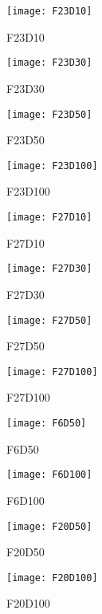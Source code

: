 \begin{figure*}[t]
    \begin{subfigure}[b]{0.24\textwidth}
        \texttt{[image: F23D10]}
        \caption{F23D10}
    \end{subfigure}
    \begin{subfigure}[b]{0.24\textwidth}
        \texttt{[image: F23D30]}
        \caption{F23D30}
    \end{subfigure}    
    \begin{subfigure}[b]{0.24\textwidth}
        \texttt{[image: F23D50]}
        \caption{F23D50}
    \end{subfigure}
    \begin{subfigure}[b]{0.24\textwidth}
        \texttt{[image: F23D100]}
        \caption{F23D100}
    \end{subfigure}

    \begin{subfigure}[b]{0.24\textwidth}
        \texttt{[image: F27D10]}
        \caption{F27D10}
    \end{subfigure}
    \begin{subfigure}[b]{0.24\textwidth}
        \texttt{[image: F27D30]}
        \caption{F27D30}
    \end{subfigure}    
    \begin{subfigure}[b]{0.24\textwidth}
        \texttt{[image: F27D50]}
        \caption{F27D50}
    \end{subfigure}
    \begin{subfigure}[b]{0.24\textwidth}
        \texttt{[image: F27D100]}
        \caption{F27D100}
    \end{subfigure}

    \begin{subfigure}[b]{0.24\textwidth}
        \texttt{[image: F6D50]}
        \caption{F6D50}
    \end{subfigure}
    \begin{subfigure}[b]{0.24\textwidth}
        \texttt{[image: F6D100]}
        \caption{F6D100}
    \end{subfigure}
    \begin{subfigure}[b]{0.24\textwidth}
        \texttt{[image: F20D50]}
        \caption{F20D50}
    \end{subfigure}
    \begin{subfigure}[b]{0.24\textwidth}
        \texttt{[image: F20D100]}
        \caption{F20D100}
    \end{subfigure}


\end{figure*}
